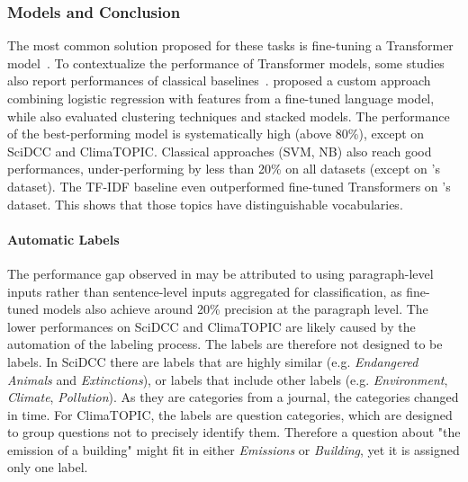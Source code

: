 
\subsubsection{Models and Conclusion}

\solutions The most common solution proposed for these tasks is fine-tuning a Transformer model~\cite{huangFinBERTLargeLanguage2020, schimanski_bridging_2023, LEE2023119726, bingler_cheap_2021, sampson_tcfd-nlp_nodate, vaid-etal-2022-towards, spokoyny2023answering, Schimanski2024nature, jain_supply_2023}. To contextualize the performance of Transformer models, some studies also report performances of classical baselines~\cite{huangFinBERTLargeLanguage2020, spokoyny2023answering, Schimanski2024nature, jain_supply_2023, bingler_cheap_2021, sampson_tcfd-nlp_nodate}. \citet{bingler_cheap_2021} proposed a custom approach combining logistic regression with features from a fine-tuned language model, while \citet{sampson_tcfd-nlp_nodate} also evaluated clustering techniques and stacked models. The performance of the best-performing model is systematically high (above 80\%), except on SciDCC and ClimaTOPIC. %
Classical approaches (SVM, NB) also reach good performances, under-performing by less than 20\% on all datasets (except on \citet{bingler_cheap_2021}'s dataset). The TF-IDF baseline even outperformed fine-tuned Transformers on \citet{sampson_tcfd-nlp_nodate}'s dataset. This shows that those topics have distinguishable vocabularies. 

\paragraph{Automatic Labels} The performance gap observed in \citet{bingler_cheap_2021} may be attributed to using paragraph-level inputs rather than sentence-level inputs aggregated for classification, as fine-tuned models also achieve around 20\% precision at the paragraph level.
The lower performances on SciDCC\cite{mishra2021neuralnere} and ClimaTOPIC\cite{spokoyny2023answering} are likely caused by the automation of the labeling process. The labels are therefore not designed to be labels. In SciDCC there are labels that are highly similar (e.g. \textit{Endangered Animals} and \textit{Extinctions}), or labels that include other labels (e.g. \textit{Environment}, \textit{Climate}, \textit{Pollution}). As they are categories from a journal, the categories changed in time. For ClimaTOPIC, the labels are question categories, which are designed to group questions not to precisely identify them. Therefore a question about "the emission of a building" might fit in either \textit{Emissions} or \textit{Building}, yet it is assigned only one label. 

